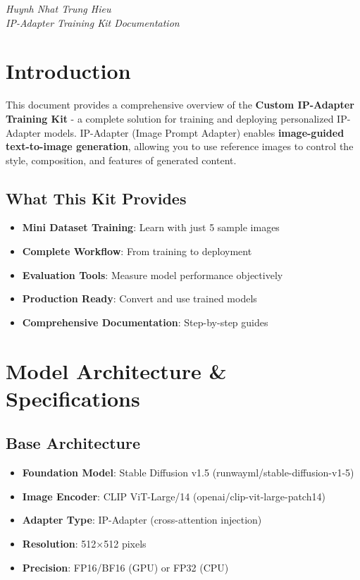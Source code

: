 \documentclass[11pt,a4paper]{article}
\begin{document}
\begin{titlepage}
    \vspace{1cm}
    
    \textit{Huynh Nhat Trung Hieu}\\
    \textit{IP-Adapter Training Kit Documentation}
    
\end{titlepage}

\tableofcontents
\newpage

\section{Introduction}

This document provides a comprehensive overview of the \textbf{Custom IP-Adapter Training Kit} - a complete solution for training and deploying personalized IP-Adapter models. IP-Adapter (Image Prompt Adapter) enables \textbf{image-guided text-to-image generation}, allowing you to use reference images to control the style, composition, and features of generated content.

\subsection{What This Kit Provides}

\begin{itemize}
    \item \textbf{Mini Dataset Training}: Learn with just 5 sample images
    \item \textbf{Complete Workflow}: From training to deployment
    \item \textbf{Evaluation Tools}: Measure model performance objectively
    \item \textbf{Production Ready}: Convert and use trained models
    \item \textbf{Comprehensive Documentation}: Step-by-step guides
\end{itemize}

\section{Model Architecture \& Specifications}

\subsection{Base Architecture}

\begin{itemize}
    \item \textbf{Foundation Model}: Stable Diffusion v1.5 (runwayml/stable-diffusion-v1-5)
    \item \textbf{Image Encoder}: CLIP ViT-Large/14 (openai/clip-vit-large-patch14)
    \item \textbf{Adapter Type}: IP-Adapter (cross-attention injection)
    \item \textbf{Resolution}: 512×512 pixels
    \item \textbf{Precision}: FP16/BF16 (GPU) or FP32 (CPU)
\end{itemize}
\end{document}
